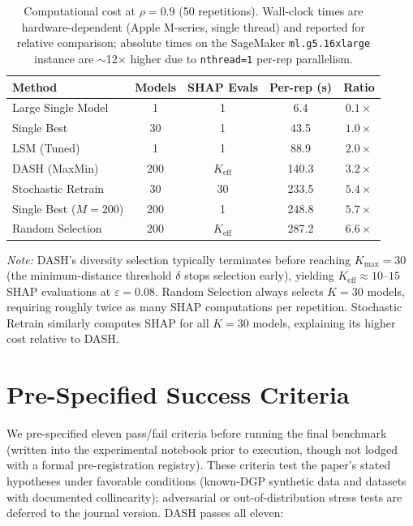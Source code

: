 \documentclass[11pt]{article}
\newcommand{\dash}{\textsc{DASH}}
\newcommand{\rhovar}{\rho}
\begin{document}
\begin{table}[H]
\centering
\caption{Computational cost at $\rhovar = 0.9$ (50 repetitions).
Wall-clock times are hardware-dependent (Apple M-series, single thread)
and reported for relative comparison; absolute times on the SageMaker
\texttt{ml.g5.16xlarge} instance are $\sim$12$\times$ higher due to
\texttt{nthread=1} per-rep parallelism.}
\label{tab:cost}
\small
\begin{tabular}{lcccc}
\toprule
\textbf{Method} & \textbf{Models} & \textbf{SHAP Evals} & \textbf{Per-rep (s)} & \textbf{Ratio} \\
\midrule
Large Single Model & 1  & 1  & \phantom{00}6.4 & $0.1\times$ \\
Single Best       & 30  & 1  & \phantom{0}43.5 & $1.0\times$ \\
LSM (Tuned)       & 1   & 1  & \phantom{0}88.9 & $2.0\times$ \\
\dash{} (MaxMin)  & 200 & $K_{\text{eff}}$ & 140.3 & $3.2\times$ \\
Stochastic Retrain & 30 & 30 & 233.5 & $5.4\times$ \\
Single Best ($M{=}200$)  & 200 & 1  & 248.8 & $5.7\times$ \\
Random Selection  & 200 & $K_{\text{eff}}$ & 287.2 & $6.6\times$ \\
\bottomrule
\end{tabular}
\smallskip

\noindent\textit{Note:} \dash{}'s diversity selection typically terminates
before reaching $K_{\max} = 30$ (the minimum-distance threshold $\delta$
stops selection early), yielding $K_{\text{eff}} \approx 10$--$15$ SHAP
evaluations at $\varepsilon = 0.08$. Random Selection always selects
$K = 30$ models, requiring roughly twice as many SHAP computations per
repetition. Stochastic Retrain similarly computes SHAP for all $K = 30$
models, explaining its higher cost relative to \dash{}.
\end{table}

\section{Pre-Specified Success Criteria}
\label{app:criteria}

We pre-specified eleven pass/fail criteria before running the final
benchmark (written into the experimental notebook prior to execution,
though not lodged with a formal pre-registration registry). These criteria test the paper's stated hypotheses under
favorable conditions (known-DGP synthetic data and datasets with
documented collinearity); adversarial or out-of-distribution stress
tests are deferred to the journal version. \dash{} passes all eleven:
\end{document}
